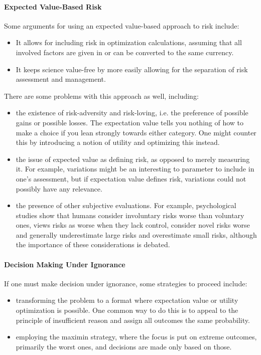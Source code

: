 \paragraph{Expected Value-Based Risk}
Some arguments for using an expected value-based approach to risk include:
\begin{itemize}
	\item It allows for including risk in optimization calculations, assuming that all involved factors are given in or can be converted to the same currency.
	\item It keeps science value-free by more easily allowing for the separation of risk assessment and management.
\end{itemize}

There are some problems with this approach as well, including:
\begin{itemize}
	\item the existence of risk-adversity and risk-loving, i.e. the preference of possible gains or possible losses. The expectation value tells you nothing of how to make a choice if you lean strongly towards either category. One might counter this by introducing a notion of utility and optimizing this instead.
	\item the issue of expected value as defining risk, as opposed to merely measuring it. For example, variations might be an interesting to parameter to include in one's assessment, but if expectation value defines risk, variations could not possibly have any relevance.
	\item the presence of other subjective evaluations. For example, psychological studies show that humans consider involuntary risks worse than voluntary ones, views risks as worse when they lack control, consider novel risks worse and generally underestimate large risks and overestimate small risks, although the importance of these considerations is debated.
\end{itemize}

\paragraph{Decision Making Under Ignorance}
If one must make decision under ignorance, some strategies to proceed include:
\begin{itemize}
	\item transforming the problem to a format where expectation value or utility optimization is possible. One common way to do this is to appeal to the principle of insufficient reason and assign all outcomes the same probability.
	\item employing the maximin strategy, where the focus is put on extreme outcomes, primarily the worst ones, and decisions are made only based on those.
\end{itemize}

